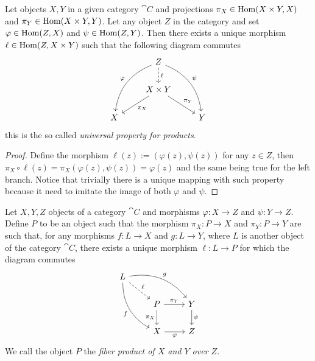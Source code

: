 \begin{proposition}\label{universal property for products}
   Let objects \(X, Y\) in a given category \(\cat{C}\) and projections \(\pi_X
   \in \operatorname{Hom}(X \times Y, X)\) and \(\pi_Y \in \operatorname{Hom}(X \times Y, Y)\). Let any
   object \(Z\) in the category and set \(\varphi \in \operatorname{Hom}(Z, X)\) and \(\psi
   \in \operatorname{Hom}(Z, Y)\). Then there exists a unique morphism \(\ell \in \operatorname{Hom}(Z, X
   \times Y)\) such that the following diagram commutes
   \[
      \begin{tikzcd}
          & Z 
          \ar[d, dashed, "\ell"] 
          \ar[ddl, bend right, swap, "\varphi"] 
          \ar[ddr, bend left, "\psi"]
            & \\
          & X \times Y \ar[dl, "\pi_X"] \ar[dr, "\pi_Y"] \\
        X 
          & 
            & Y
      \end{tikzcd}
   \] 
   this is the so called \emph{universal property for products}.
\end{proposition}

\begin{proof}
   Define the morphism \(\ell(z) := (\varphi(z), \psi(z))\) for any  \(z \in
   Z\), then \(\pi_X \circ \ell (z) = \pi_X(\varphi(z), \psi(z)) = \varphi(z)\) 
   and the same being true for the left branch. Notice that trivially there is a
   unique mapping with such property because it need to imitate the image of
   both \(\varphi\) and \(\psi\).
\end{proof}

\begin{proposition}
   Let \(X, Y, Z\) objects of a category \(\cat C\) and morphisms \(\varphi :X
   \to Z\) and \(\psi : Y \to Z\). Define \(P\) to be an object such that the
   morphism  \(\pi_X : P \to X\) and  \(\pi_Y : P \to Y\) are such that, for any
   morphisms \(f : L \to X\) and  \(g : L \to Y\), where \(L\) is another object
   of the category \(\cat C\), there exists a unique morphism \(\ell: L \to P\) 
   for which the diagram commutes
   \[
     \begin{tikzcd}
       L
       \ar[dr, dashed, "\ell"]
       \ar[drr, bend left, "g"]
       \ar[ddr, bend right, swap, "f"]
        &
          & \\
        &P
        \ar[r, "\pi_Y"]
        \ar[d, swap, "\pi_X"]
          &Y
          \ar[d, "\psi"]
          \\
        &X
        \ar[r, swap, "\varphi"]
          &Z
     \end{tikzcd}
   \] 
   We call the object \(P\) the \emph{fiber product of \(X\) and \(Y\) over \(Z\)}.
\end{proposition}

